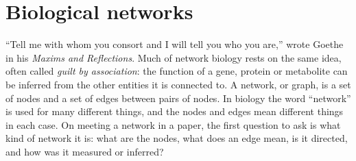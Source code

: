
\providecommand{\R}{\mathbb{R}}
\providecommand{\E}{\mathbb{E}}
\providecommand{\Normal}{\mathcal{N}}
\providecommand{\argmax}{\operatorname*{arg\,max}}
\providecommand{\argmin}{\operatorname*{arg\,min}}
\providecommand{\vy}{\mathbf{y}}
\providecommand{\vx}{\mathbf{x}}
\providecommand{\mX}{\mathbf{X}}
\providecommand{\mI}{\mathbf{I}}
\providecommand{\vb}{\boldsymbol{\beta}}
\providecommand{\veps}{\boldsymbol{\epsilon}}
\providecommand{\vp}{\mathbf{p}}
\providecommand{\vg}{\mathbf{g}}
\providecommand{\ind}{\mathbf{1}}
\providecommand{\mA}{\mathbf{A}}
\providecommand{\mTheta}{\boldsymbol{\Theta}}
\providecommand{\mSigma}{\boldsymbol{\Sigma}}
\providecommand{\hSigma}{\hat{\boldsymbol{\Sigma}}}
\providecommand{\mGamma}{\boldsymbol{\Gamma}}
\providecommand{\veta}{\boldsymbol{\eta}}
\providecommand{\vc}{\mathbf{c}}
\providecommand{\vz}{\mathbf{z}}
\providecommand{\vpi}{\boldsymbol{\pi}}
\providecommand{\tr}{\operatorname{tr}}
\providecommand{\cor}{\operatorname{cor}}
\providecommand{\Cov}{\operatorname{Cov}}
\providecommand{\Var}{\operatorname{Var}}
\providecommand{\Bern}{\operatorname{Bernoulli}}
\providecommand{\Cat}{\operatorname{Categorical}}
\providecommand{\Dir}{\operatorname{Dirichlet}}
\providecommand{\indep}{\perp\!\!\!\perp}



\providecommand{\chaptertoc}{}
\chapter{Biological networks}
\label{ch:networks}
\chaptertoc

``Tell me with whom you consort and I will tell you who you are,'' wrote Goethe in his \textit{Maxims and Reflections}. Much of network biology rests on the same idea, often called \emph{guilt by association}: the function of a gene, protein or metabolite can be inferred from the other entities it is connected to. A network, or graph, is a set of nodes and a set of edges between pairs of nodes. In biology the word ``network'' is used for many different things, and the nodes and edges mean different things in each case. On meeting a network in a paper, the first question to ask is what kind of network it is: what are the nodes, what does an edge mean, is it directed, and how was it measured or inferred?

